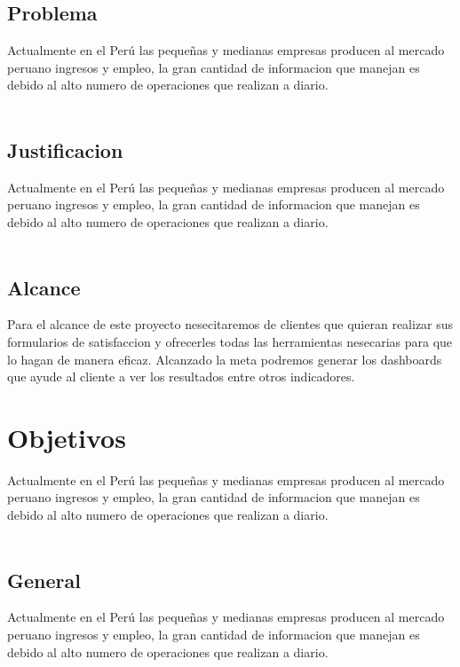 \documentclass[twoside,twocolumn]{article}
\begin{document}
\subsection{Problema}
Actualmente en el Perú las pequeñas y medianas empresas producen al mercado peruano ingresos y empleo, la gran cantidad de informacion que manejan es debido al alto numero de operaciones que realizan a diario.\\ \\

\subsection{Justificacion}
Actualmente en el Perú las pequeñas y medianas empresas producen al mercado peruano ingresos y empleo, la gran cantidad de informacion que manejan es debido al alto numero de operaciones que realizan a diario.\\ \\

\subsection{Alcance}
Para el alcance de este proyecto nesecitaremos de clientes que quieran realizar sus formularios de satisfaccion y ofrecerles todas las herramientas nesecarias para que lo hagan de manera eficaz. Alcanzado la meta podremos generar los dashboards que ayude al cliente a ver los resultados entre otros indicadores.


\section{Objetivos}
Actualmente en el Perú las pequeñas y medianas empresas producen al mercado peruano ingresos y empleo, la gran cantidad de informacion que manejan es debido al alto numero de operaciones que realizan a diario.\\ \\

\subsection{General}
Actualmente en el Perú las pequeñas y medianas empresas producen al mercado peruano ingresos y empleo, la gran cantidad de informacion que manejan es debido al alto numero de operaciones que realizan a diario.\\ \\
\end{document}
